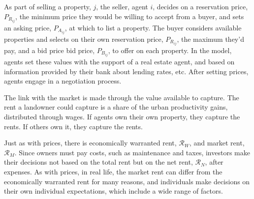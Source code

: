 As part of selling a property, $j$, the seller, agent $i$, decides on a \gls{reservation price}, $P_{R_{ij}}$, the minimum price they would be willing to accept from a buyer, and sets an \gls{asking price}, $P_{A_{ij}}$, at which to list a property. The buyer considers available properties and selects on their own reservation price, $P_{R_{ij}}$, the maximum they'd pay, and a bid price \gls{bid price}, $P_{B_{ij}}$, to offer on each property.
In the model, agents set these values with the support of a real estate agent, and based on information provided by their bank about lending rates, etc. After setting prices, agents engage in a negotiation process. 

The link with the market is made through the value available to capture.
The rent a landowner could capture is a share of the urban productivity gains, distributed through wages. If agents own their own property, they capture the rents. If others own it, they capture the rents.

Just as with prices, there  is economically \gls{warranted rent}, $\mathcal{R}_W$, and \gls{market rent}, $\mathcal{R}_M$. Since owners must pay costs, such as maintenance and taxes, investors make their decisions not based on the total rent but on the \gls{net rent}, $\mathcal{R}_N$, after expenses. As with prices, in real life, the market rent can differ from the economically warranted rent for many reasons, and individuals make decisions on their own individual expectations, which include a wide range of factors. 

